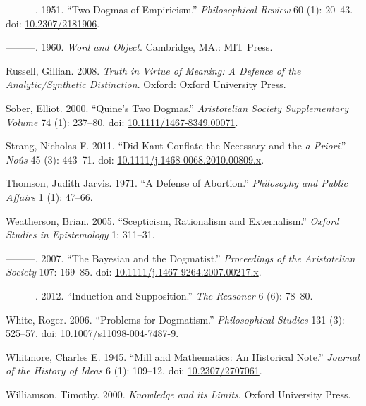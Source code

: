 \documentclass[
  11pt,
  letterpaper,
  DIV=11,
  numbers=noendperiod,
  twoside]{scrartcl}
\newlength{\cslhangindent}
\newenvironment{CSLReferences}[2] %
 {\begin{list}{}{%
  \setlength{\itemindent}{0pt}
  \setlength{\leftmargin}{0pt}
  \setlength{\parsep}{0pt}
  \ifodd #1
   \setlength{\leftmargin}{\cslhangindent}
   \setlength{\itemindent}{-1\cslhangindent}
  \fi
  \setlength{\itemsep}{#2\baselineskip}}}
 {\end{list}}
\begin{document}
\begin{CSLReferences}{1}{0}
---------. 1951. {``Two Dogmas of Empiricism.''} \emph{Philosophical
Review} 60 (1): 20--43. doi:
\href{https://doi.org/10.2307/2181906}{10.2307/2181906}.

---------. 1960. \emph{Word and Object}. Cambridge, MA.: MIT Press.

Russell, Gillian. 2008. \emph{Truth in Virtue of Meaning: A Defence of
the Analytic/Synthetic Distinction}. Oxford: Oxford University Press.

Sober, Elliot. 2000. {``Quine's Two Dogmas.''} \emph{Aristotelian
Society Supplementary Volume} 74 (1): 237--80. doi:
\href{https://doi.org/10.1111/1467-8349.00071}{10.1111/1467-8349.00071}.

Strang, Nicholas F. 2011. {``Did Kant Conflate the Necessary and the
\emph{a Priori}.''} \emph{No{û}s} 45 (3): 443--71. doi:
\href{https://doi.org/10.1111/j.1468-0068.2010.00809.x}{10.1111/j.1468-0068.2010.00809.x}.

Thomson, Judith Jarvis. 1971. {``A Defense of Abortion.''}
\emph{Philosophy and Public Affairs} 1 (1): 47--66.

Weatherson, Brian. 2005. {``Scepticism, Rationalism and Externalism.''}
\emph{Oxford Studies in Epistemology} 1: 311--31.

---------. 2007. {``The Bayesian and the Dogmatist.''} \emph{Proceedings
of the Aristotelian Society} 107: 169--85. doi:
\href{https://doi.org/10.1111/j.1467-9264.2007.00217.x}{10.1111/j.1467-9264.2007.00217.x}.

---------. 2012. {``Induction and Supposition.''} \emph{The Reasoner} 6
(6): 78--80.

White, Roger. 2006. {``Problems for Dogmatism.''} \emph{Philosophical
Studies} 131 (3): 525--57. doi:
\href{https://doi.org/10.1007/s11098-004-7487-9}{10.1007/s11098-004-7487-9}.

Whitmore, Charles E. 1945. {``Mill and Mathematics: An Historical
Note.''} \emph{Journal of the History of Ideas} 6 (1): 109--12. doi:
\href{https://doi.org/10.2307/2707061}{10.2307/2707061}.

Williamson, Timothy. 2000. \emph{{Knowledge and its Limits}}. Oxford
University Press.


\end{CSLReferences}
\end{document}

